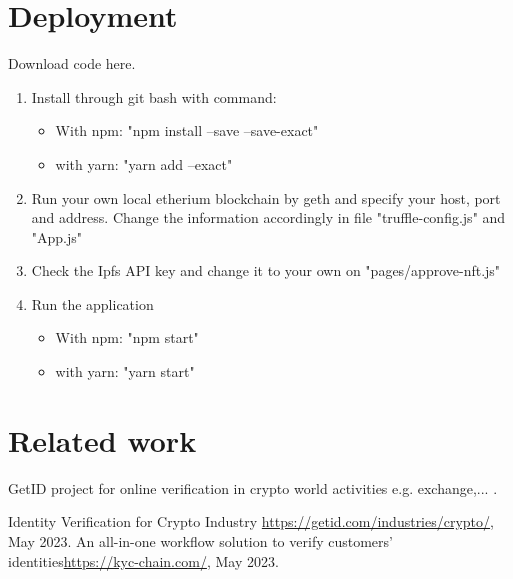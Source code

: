 \documentclass[conference]{IEEEtran}
\begin{document}
\section{Deployment}
Download code here.
\begin{enumerate}
    \item Install through git bash with command:
    \begin{itemize}
        \item With npm: "npm install --save --save-exact"
        \item with yarn: "yarn add --exact"
    \end{itemize}
    \item Run your own local etherium blockchain by geth and specify your host, port and address. Change the information accordingly in file "truffle-config.js" and "App.js"
    \item Check the Ipfs API key and change it to your own on "pages/approve-nft.js"
    \item Run the application
        \begin{itemize}
        \item With npm: "npm start"
        \item with yarn: "yarn start"
    \end{itemize}
\end{enumerate}

\section{Related work}

GetID project for online verification in crypto world activities e.g. exchange,... \cite{b1} \cite{b2}. 

\begin{thebibliography}{00}
 Identity Verification for Crypto Industry
 \url{https://getid.com/industries/crypto/}, May 2023.
 An all-in-one workflow solution to verify  customers’ identities\url{https://kyc-chain.com/}, May 2023.

\end{thebibliography}
\end{document}
